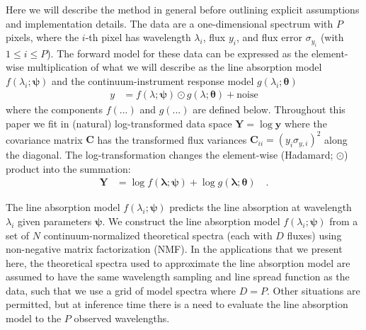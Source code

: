 \documentclass[modern]{aastex631}
\renewcommand{\vec}[1]{\mathbf{#1}}
\newcommand{\vectheta}{\boldsymbol{\theta}}
\newcommand{\vecpsi}{\boldsymbol{\psi}}
\newcommand{\hadamard}{\odot}
\begin{document}
Here we will describe the method in general before outlining explicit assumptions and implementation details. The data are a one-dimensional spectrum with $P$ pixels, where the $i$-th pixel has wavelength $\lambda_i$, flux $y_i$, and flux error $\sigma_{y_i}$ (with $1 \leq i \leq P$). The forward model for these data can be expressed as the element-wise multiplication of what we will describe as the line absorption model $f(\lambda_i; \vecpsi)$ and the continuum-instrument response model $g(\lambda_i;\vectheta)$
\begin{align}
    y &= f(\lambda;\vecpsi)\hadamard{}g(\lambda;\vectheta) + \mbox{noise}
\end{align}
where the components $f(...)$ and $g(...)$ are defined below. Throughout this paper we fit in (natural) log-transformed data space $\vec{Y} = \log{\vec{y}}$ where the covariance matrix $\vec{C}$ has the transformed flux variances $\vec{C}_{ii} = (y_{i}\sigma_{y,i})^2$ along the diagonal. The log-transformation changes the element-wise (Hadamard; $\hadamard$) product into the summation:
\begin{align}
    \label{eq:log_y}
    \vec{Y} &= \log{f(\vec{\lambda}; \vecpsi)} + \log{g(\vec{\lambda};\vectheta)} \quad .
\end{align}

The line absorption model $f(\lambda_i;\vecpsi)$ predicts the line absorption at wavelength $\lambda_i$ given parameters $\vecpsi$. We construct the line absorption model $f(\lambda_i;\vecpsi)$ from a set of $N$ continuum-normalized theoretical spectra (each with $D$ fluxes) using non-negative matrix factorization (NMF). In the applications that we present here, the theoretical spectra used to approximate the line absorption model are assumed to have the same wavelength sampling and line spread function as the data, such that we use a grid of model spectra where $D = P$. Other situations are permitted, but at inference time there is a need to evaluate the line absorption model to the $P$ observed wavelengths.\\
\end{document}
